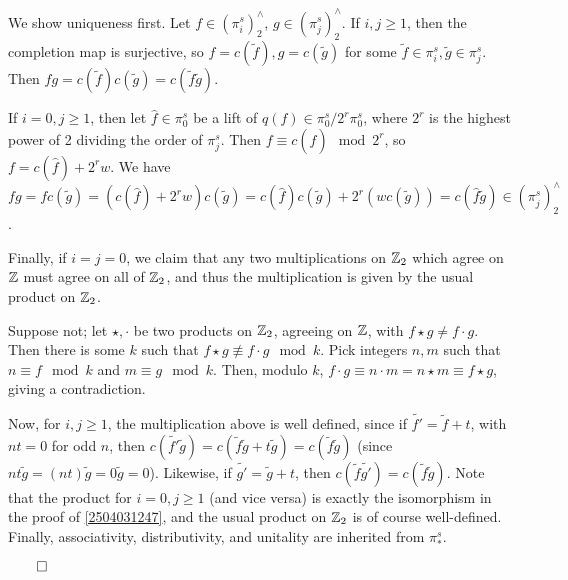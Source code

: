 \documentclass{MetricNotes2023}
\def\inte{\ensuremath\mathbb{Z}}
\def\done{\begin{flushright}\vspace{-4.35ex}\(\qed\)\end{flushright}}
\begin{document}
\begin{ourproof}
We show uniqueness first. Let \(f \in (\pi_i^s)^\wedge_2\), \(g \in (\pi_j^s)^\wedge_2\). If \(i,j \geq 1\), then the completion map is surjective, so \(f=c(\tilde f), g = c(\tilde g)\) for some \(\tilde f \in \pi_i^s, \tilde g \in \pi_j^s\). Then \(fg=c(\tilde f)c(\tilde g)=c(\tilde f \tilde g)\).

If \(i=0, j\geq 1\), then let \(\hat f\in \pi_0^s\) be a lift of \(q(f)\in \pi_0^s/2^r\pi_0^s\), where \(2^r\) is the highest power of 2 dividing the order of \(\pi_j^s\). Then \(f\equiv c(\hat f) \mod 2^r\), so \(f=c(\hat f) + 2^rw\). We have \(fg=fc(\tilde g)=(c(\hat f) + 2^r w)c(\tilde g)=c(\hat f) c(\tilde g)+2^r(wc(\tilde g))=c(\hat f \tilde g)\in (\pi_j^s)^\wedge_2\). 

Finally, if \(i=j=0\), we claim that any two multiplications on \(\inte_2\) which agree on \(\inte\) must agree on all of \(\inte_2\), and thus the multiplication is given by the usual product on \(\inte_2\). 

Suppose not; let \(\star, \cdot\) be two products on \(\inte_2\), agreeing on \(\inte\), with \(f\star g \neq f \cdot g\). Then there is some \(k\) such that \(f \star g \not\equiv f \cdot g \mod k\). Pick integers \(n, m\) such that \(n\equiv f \mod k\) and \(m \equiv g \mod k\). Then, modulo \(k\), \(f\cdot g \equiv n\cdot m =n\star m \equiv f \star g\), giving a contradiction.

Now, for \(i, j \geq 1\), the multiplication above is well defined, since if \(\tilde{f'}=\tilde f+t\), with \(nt=0\) for odd \(n\), then \(c(\tilde{f'}\tilde g)=c(\tilde f \tilde g + t\tilde g)=c(\tilde f \tilde g)\) (since \(nt\tilde g=(nt)\tilde g = 0\tilde g = 0\)). Likewise, if \(\tilde{g'}=\tilde g + t\), then \(c(\tilde f \tilde{g'})=c(\tilde f \tilde g)\). Note that the product for \(i=0, j \geq 1\)  (and vice versa) is exactly the isomorphism in the proof of \ref{2504031247}, and the usual product on \(\inte_2\) is of course well-defined. Finally, associativity, distributivity, and unitality are inherited from \(\pi_*^s\). \done
\end{ourproof}
\end{document}
